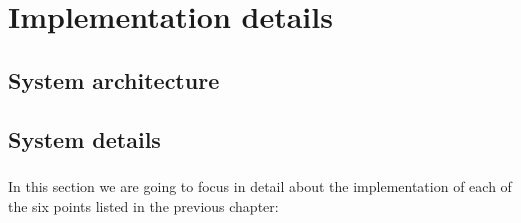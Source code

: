 \chapter{Implementation details}
\label{chapter4}
\thispagestyle{empty}

\section{System architecture}

\section{System details}
\paragraph{}
In this section we are going to focus in detail about the implementation of each of the six points listed in the previous chapter:
